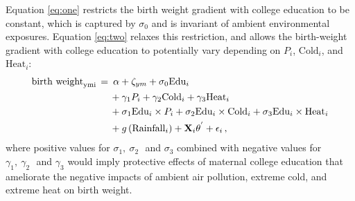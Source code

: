 Equation \eqref{eq:one} restricts the birth weight gradient with  college education 
to be constant, which is captured by \(\sigma_{0}\) and is invariant of ambient
environmental exposures. Equation \eqref{eq:two} relaxes this restriction, and allows the
 birth-weight gradient with college education to potentially vary
depending on \(P_{i}\), \(\text{Cold}_{i}\), and \(\text{Heat}_{i}\):
\begin{align}
\label{eq:two}
\begin{split}
\text{birth weight}_{\text{ymi}}\thinspace=&\thinspace\thinspace\thinspace 
\alpha + \zeta_{ym} + \sigma_{0}\text{Edu}_{i} \\
&\thinspace 
+ \gamma_{1}P_{i} + \gamma_{2}\text{Cold}_{i} + \gamma_{3}\text{Heat}_{i}\\
&\thinspace 
+ \sigma_{1}\text{Edu}_{i} \times P_{i} + \sigma_{2}\text{Edu}_{i} \times \text{Cold}_{i} + \sigma_{3}\text{Edu}_{i} \times \text{Heat}_{i}\\
&\thinspace
+ g\left( \text{Rainfall}_{i} \right) + \mathbf{X}_{i}\theta^{'} + \epsilon_{i}
\thinspace,\\
\end{split}
\end{align}
where positive values for \(\sigma_{1},\ \sigma_{2}\text{\ \ }\)and
\(\sigma_{3}\) combined with negative values for
\(\gamma_{1},\ \gamma_{2}\text{\ \ }\)and \(\gamma_{3}\) would imply
protective effects of maternal college education that ameliorate the
negative impacts of ambient air pollution, extreme cold, and extreme heat
on birth weight.

